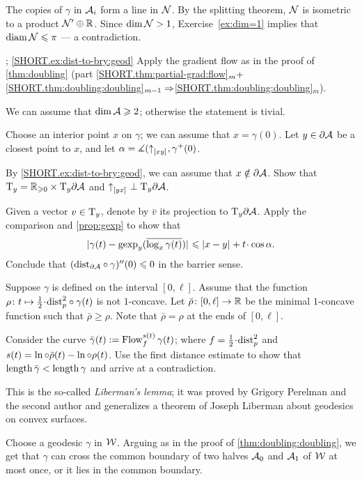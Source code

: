 The copies of $\gamma$ in $\mathcal{A}_{i}$ form a line in $\mathcal{N}$.
By the splitting theorem, $\mathcal{N}$ is isometric to a product $\mathcal{N}'\oplus \mathbb{R}$.
Since $\operatorname{\rm dim}\nolimits\mathcal{N}>1$, Exercise~\ref{ex:dim=1} implies that $\operatorname{\rm diam}\nolimits\mathcal{N}\leqslant \pi$ --- a contradiction.

\parbf{\ref{ex:dist-to-bry}}; \ref{SHORT.ex:dist-to-bry:geod}
Apply the gradient flow as in the proof of \ref{thm:doubling} (part \ref{SHORT.thm:partial-grad:flow}$_{m}+$\ref{SHORT.thm:doubling:doubling}$_{m-1}\Rightarrow$\ref{SHORT.thm:doubling:doubling}$_m$).

We can assume that $\operatorname{\rm dim}\nolimits \mathcal{A}\geqslant 2$; otherwise the statement is tivial.

Choose an interior point $x$ on $\gamma$;
we can assume that $x=\gamma(0)$.
Let $y\in \partial \mathcal{A}$ be a closest point to $x$,
and let $\alpha=\measuredangle({\uparrow}_{[{x}{y}]_{{}}},\gamma^+(0)$.

By \ref{SHORT.ex:dist-to-bry:geod}, we can assume that $x\notin \partial \mathcal{A}$.
Show that $\mathrm{T}_y=\mathbb{R}_{\geqslant0}\times\mathrm{T}_y\partial \mathcal{A}$
and ${\uparrow}_{[{y}{x}]_{{}}}\perp \mathrm{T}_y\partial \mathcal{A}$.

Given a vector $v\in \mathrm{T}_y$, denote by $\bar v$ its projection to $\mathrm{T}_y\partial \mathcal{A}$.
Apply the comparison and \ref{prop:gexp} to show that 
\[\dist{\gamma(t)}{\gexp_y(\overline{\log_x\gamma(t)})}{}\le \dist{x}{y}{}+t\cdot\cos\alpha.\]
Conclude that $(\mathrm{dist}_{\partial \mathcal{A}}\circ\gamma)''(0)\leqslant 0$ in the barrier sense.


Suppose $\gamma$ is defined on the interval $[0,\ell]$.
Assume that the function $\rho\:t\mapsto \tfrac12\cdot\distfun_p^2\circ\gamma(t)$ is not $1$-concave.
Let $\bar\rho\colon[0,\ell]\to\mathbb{R}$ be the minimal $1$-concave function such that $\bar\rho\ge \rho$.
Note that $\bar\rho=\rho$ at the ends of $[0,\ell]$.

Consider the curve $\bar\gamma(t)\mathrel{:=} \mathop{\rm Flow}\nolimits_f^{s(t)}\gamma(t)$;
where $f=\tfrac12\cdot\distfun_p^2$ and $s(t)=\ln\circ\bar\rho(t)-\ln\circ\rho(t)$.
Use the first distance estimate to show that $\mathop{\rm length}\nolimits\bar\gamma<\mathop{\rm length}\nolimits\gamma$ and arrive at a contradiction.

This is the so-called \emph{Liberman's lemma};
it was proved by Grigory Perelman and the second author \cite{perelman-petrunin} and generalizes a theorem of Joseph Liberman \cite{liberman} about geodesics on convex surfaces.

Choose a geodesic $\gamma$ in $\mathcal{W}$.
Arguing as in the proof of \ref{thm:doubling:doubling}, we get 
that $\gamma$ can cross the common boundary of two halves $\mathcal{A}_0$ and $\mathcal{A}_1$ of $\mathcal{W}$ at most once, or it lies in the common boundary.

